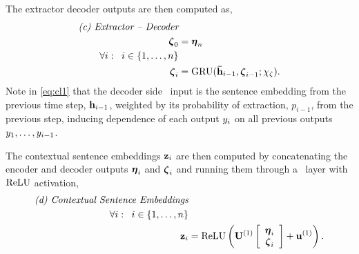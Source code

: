 The extractor decoder outputs are then computed as,
%
\begin{align}
    \textit{(c) Extractor -- Decoder} & \nonumber \\
    \boldsymbol{\zeta}_0  &= \boldsymbol{\eta}_n  \\
    \forall i : \;\; i \in \{1,\ldots,n\}&\nonumber\\
   \boldsymbol{\zeta}_i &= \operatorname{GRU}(\boldsymbol{\bar{\mathbf{h}}}_{i-1}, \boldsymbol{\zeta}_{i-1};\chi_\zeta). \label{eq:cl1} 
\end{align}
Note in \autoref{eq:cl1} that 
the decoder side \gru~input is the sentence embedding from the previous time
step, $\mathbf{h}_{i-1}$, weighted by its probability of extraction, $p_{i-1}$, 
from the 
previous step, inducing dependence of each output $y_i$ on all previous 
outputs $y_1,\ldots,y_{i-1}$.


The contextual sentence embeddings $\mathbf{z}_i$ are then computed by concatenating
the encoder and decoder outputs $\boldsymbol{\eta}_i$ and $\boldsymbol{\zeta}_i$ and running
them through a \feedforward~layer with $\operatorname{ReLU}$ activation,
\begin{align}
\textit{(d) Contextual Sentence Embeddings} & \nonumber\\
    \forall i : \;\; i \in \{1,\ldots,n\}&\nonumber \\
\mathbf{z}_i &= \operatorname{ReLU}\left(\mathbf{U}^{(1)} \left[\begin{array}{c}\boldsymbol{\eta}_i \\ \boldsymbol{\zeta}_i \end{array}\right] + \mathbf{u}^{(1)} \right).
\end{align}



